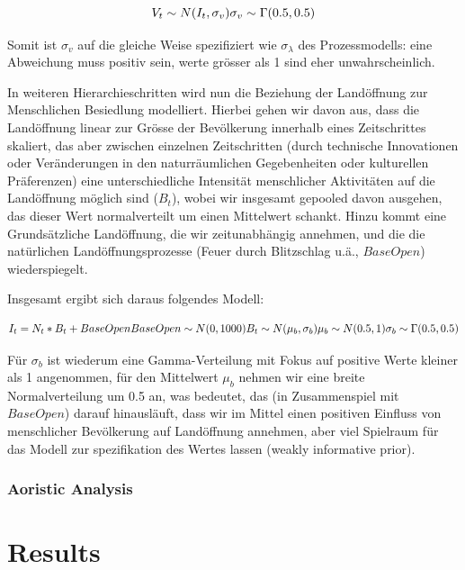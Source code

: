\documentclass[
]{article}
\begin{document}
\[
V_t \sim N(I_t, \sigma_v) \\
\sigma_v \sim \Gamma(0.5, 0.5)
\]

Somit ist \(\sigma_v\) auf die gleiche Weise spezifiziert wie \(\sigma_\lambda\) des Prozessmodells: eine Abweichung muss positiv sein, werte grösser als 1 sind eher unwahrscheinlich.

In weiteren Hierarchieschritten wird nun die Beziehung der Landöffnung zur Menschlichen Besiedlung modelliert. Hierbei gehen wir davon aus, dass die Landöffnung linear zur Grösse der Bevölkerung innerhalb eines Zeitschrittes skaliert, das aber zwischen einzelnen Zeitschritten (durch technische Innovationen oder Veränderungen in den naturräumlichen Gegebenheiten oder kulturellen Präferenzen) eine unterschiedliche Intensität menschlicher Aktivitäten auf die Landöffnung möglich sind (\(B_t\)), wobei wir insgesamt gepooled davon ausgehen, das dieser Wert normalverteilt um einen Mittelwert schankt. Hinzu kommt eine Grundsätzliche Landöffnung, die wir zeitunabhängig annehmen, und die die natürlichen Landöffnungsprozesse (Feuer durch Blitzschlag u.ä., \(BaseOpen\)) wiederspiegelt.

Insgesamt ergibt sich daraus folgendes Modell:

\[
I_t = N_t * B_t + BaseOpen \\
BaseOpen \sim N(0,1000) \\
B_t \sim N(\mu_b, \sigma_b) \\
\mu_b \sim N(0.5,1) \\
\sigma_b \sim \Gamma(0.5,0.5)
\]

Für \(\sigma_b\) ist wiederum eine Gamma-Verteilung mit Fokus auf positive Werte kleiner als 1 angenommen, für den Mittelwert \(\mu_b\) nehmen wir eine breite Normalverteilung um 0.5 an, was bedeutet, das (in Zusammenspiel mit \(BaseOpen\)) darauf hinausläuft, dass wir im Mittel einen positiven Einfluss von menschlicher Bevölkerung auf Landöffnung annehmen, aber viel Spielraum für das Modell zur spezifikation des Wertes lassen (weakly informative prior).

\hypertarget{aoristic-analysis}{%
\subsubsection{Aoristic Analysis}\label{aoristic-analysis}}

\hypertarget{results}{%
\section{Results}\label{results}}
\end{document}
